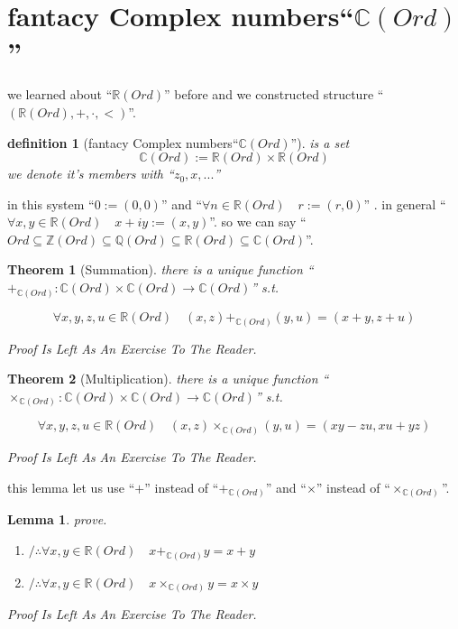 \documentclass[10pt,a4paper]{book}
\newtheorem{definition}{definition}[section]
\newtheorem{theorem}{Theorem}[section]
\newtheorem{lemma}{Lemma}[section]
\begin{document}
\section{fantacy Complex numbers``$\mathbb{C} (Ord)$''}

we learned about ``$\mathbb{R} (Ord)$'' before and we constructed structure
``$(\mathbb{R} (Ord) , + , \cdot , <)$''.

\begin{definition}[fantacy Complex numbers``$\mathbb{C} (Ord)$''] is a set
    \[ \mathbb{C} (Ord) := \mathbb{R} (Ord) \times \mathbb{R} (Ord) \]
    we denote it's members with ``$z_0 , x ,...$''
\end{definition}

in this system ``$ 0 := (0,0)$'' and ``$ \forall n \in \mathbb{R} (Ord) \quad r
    := (r,0)$'' . in general ``$\forall x,y \in \mathbb{R} (Ord) \quad x + iy :=
    (x,y)$''. so we can say ``$Ord \subseteq \mathbb{Z} (Ord) \subseteq \mathbb{Q}
    (Ord) \subseteq \mathbb{R} (Ord) \subseteq \mathbb{C} (Ord)$''.

\begin{theorem}[Summation] there is a unique function ``$+_{\mathbb{C} (Ord)} :\mathbb{C} (Ord) \times \mathbb{C} (Ord) \to \mathbb{C} (Ord)$'' s.t.

    \[ \forall x , y , z , u \in \mathbb{R} (Ord) \quad (x , z) +_{\mathbb{C} (Ord)}  (y , u)  = (x + y, z + u) \]

    Proof Is Left As An Exercise To The Reader.
\end{theorem}

\begin{theorem}[Multiplication] there is a unique function ``$\times_{\mathbb{C} (Ord)} :\mathbb{C} (Ord) \times \mathbb{C} (Ord) \to \mathbb{C} (Ord)$'' s.t.

    \[ \forall x , y , z , u \in \mathbb{R} (Ord) \quad (x , z) \times_{\mathbb{C} (Ord)} (y , u)  = (x y  - z u , x u + y z) \]

    Proof Is Left As An Exercise To The Reader.
\end{theorem}

this lemma let us use ``$+$'' instead of ``$+_{\mathbb{C} (Ord)}$'' and
``$\times$'' instead of ``$\times_{\mathbb{C} (Ord)}$''.

\begin{lemma}prove.
    \begin{enumerate}
        \setlength{\itemsep}{0pt} %
        \item       $/ \therefore   \forall x,y \in \mathbb{R} (Ord) \quad x +_{\mathbb{C} (Ord)} y  = x  + y$
        \item       $/ \therefore   \forall x,y \in \mathbb{R} (Ord) \quad x \times_{\mathbb{C} (Ord)} y  = x  \times y$
    \end{enumerate}
    Proof Is Left As An Exercise To The Reader.
\end{lemma}
\end{document}
